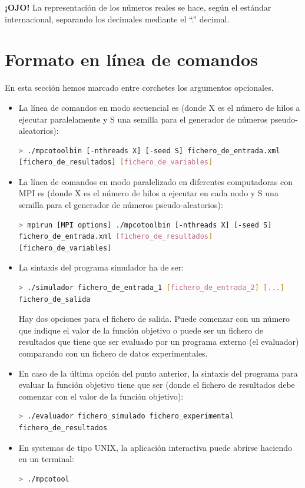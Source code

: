 \documentclass[a4paper]{report}
\begin{document}
{\bf ¡OJO!} La representación de los números reales se hace, según el estándar
internacional, separando los decimales mediante el ``.'' decimal.

\section{Formato en línea de comandos}

En esta sección hemos marcado entre corchetes los argumentos opcionales.

\begin{itemize}

\item La línea de comandos en modo secuencial es (donde X es el número de hilos
a ejecutar paralelamente y S una semilla para el generador de números
pseudo-aleatorios):
\begin{lstlisting}[language=bash,basicstyle=\scriptsize]
> ./mpcotoolbin [-nthreads X] [-seed S] fichero_de_entrada.xml
[fichero_de_resultados] [fichero_de_variables]
\end{lstlisting}

\item La línea de comandos en modo paralelizado en diferentes computadoras con
MPI es (donde X es el número de hilos a ejecutar en cada nodo y S una semilla
para el generador de números pseudo-aleatorios):
\begin{lstlisting}[language=bash,basicstyle=\scriptsize]
> mpirun [MPI options] ./mpcotoolbin [-nthreads X] [-seed S] 
fichero_de_entrada.xml [fichero_de_resultados]
[fichero_de_variables]
\end{lstlisting}

\item La sintaxis del programa simulador ha de ser:
\begin{lstlisting}[language=bash,basicstyle=\scriptsize]
> ./simulador fichero_de_entrada_1 [fichero_de_entrada_2] [...]
fichero_de_salida
\end{lstlisting}
Hay dos opciones para el fichero de salida. Puede comenzar con un número que
indique el valor de la función objetivo o puede ser un fichero de resultados que
tiene que ser evaluado por un programa externo (el evaluador) comparando con un
fichero de datos experimentales.

\item En caso de la última opción del punto anterior, la sintaxis del programa
para evaluar la función objetivo tiene que ser (donde el fichero de resultados
debe comenzar con el valor de la función objetivo):
\begin{lstlisting}[language=bash,basicstyle=\scriptsize]
> ./evaluador fichero_simulado fichero_experimental
fichero_de_resultados
\end{lstlisting}

\item En systemas de tipo UNIX, la aplicación interactiva puede abrirse haciendo
en un terminal:
\begin{lstlisting}[language=bash,basicstyle=\scriptsize]
> ./mpcotool
\end{lstlisting}

\end{itemize}
\end{document}

